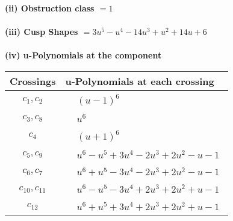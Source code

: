 \documentclass[1p]{elsarticle_modified}
\theoremstyle{definition}
\begin{document}
\flushleft \textbf{(ii) Obstruction class $= 1$}\\~\\
\flushleft \textbf{(iii) Cusp Shapes $= 3 u^5- u^4-14 u^3+u^2+14 u+6$}\\~\\
\newpage\renewcommand{\arraystretch}{1}
\flushleft \textbf{(iv) u-Polynomials at the component}\newline \\
\begin{tabular}{m{50pt}|m{274pt}}
Crossings & \hspace{64pt}u-Polynomials at each crossing \\
\hline $$\begin{aligned}c_{1},c_{2}\end{aligned}$$&$\begin{aligned}
&(u-1)^6
\end{aligned}$\\
\hline $$\begin{aligned}c_{3},c_{8}\end{aligned}$$&$\begin{aligned}
&u^6
\end{aligned}$\\
\hline $$\begin{aligned}c_{4}\end{aligned}$$&$\begin{aligned}
&(u+1)^6
\end{aligned}$\\
\hline $$\begin{aligned}c_{5},c_{9}\end{aligned}$$&$\begin{aligned}
&u^6- u^5+3 u^4-2 u^3+2 u^2- u-1
\end{aligned}$\\
\hline $$\begin{aligned}c_{6},c_{7}\end{aligned}$$&$\begin{aligned}
&u^6+u^5-3 u^4-2 u^3+2 u^2- u-1
\end{aligned}$\\
\hline $$\begin{aligned}c_{10},c_{11}\end{aligned}$$&$\begin{aligned}
&u^6- u^5-3 u^4+2 u^3+2 u^2+u-1
\end{aligned}$\\
\hline $$\begin{aligned}c_{12}\end{aligned}$$&$\begin{aligned}
&u^6+u^5+3 u^4+2 u^3+2 u^2+u-1
\end{aligned}$\\
\hline
\end{tabular}\\~\\
\end{document}
